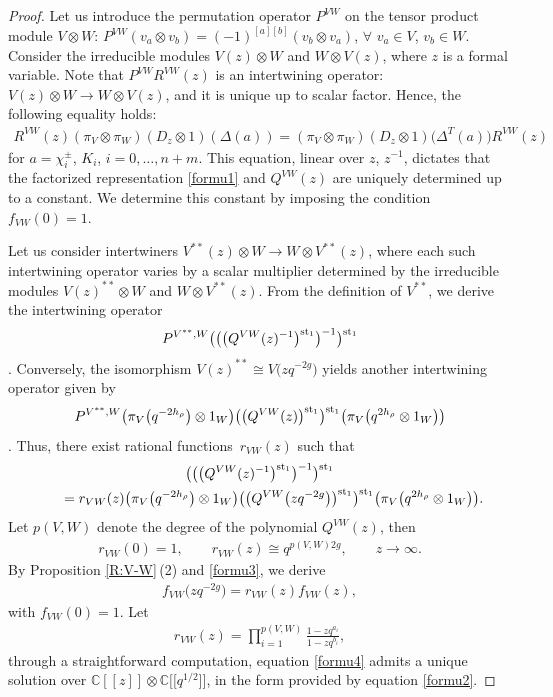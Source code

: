 \documentclass[pdftex]{sigma}
\numberwithin{equation}{section}
\begin{document}
\begin{proof}
Let us introduce the permutation operator $P^{VW}$ on the tensor product module $V\otimes W$: $P^{VW}(v_a\otimes v_b)=(-1)^{[a][b]}(v_b\otimes v_a)$, $\forall$ $v_a\in V$, $v_b\in W$. Consider the irreducible modules $V(z)\otimes W$ and $W\otimes V(z)$, where $z$ is a formal variable. Note that $P^{VW}R^{VW}(z)$ is an intertwining operator: $V(z)\otimes W\rightarrow W\otimes V(z)$, and it is unique up to scalar factor.
Hence, the following equality holds:
\begin{gather*}
 R^{VW}(z)(\pi_V\otimes\pi_W)(D_z\otimes1)(\Delta(a))=(\pi_V\otimes\pi_W)(D_z\otimes1)\bigl(\Delta^T(a)\bigr)R^{VW}(z)
\end{gather*}
for $a=\chi_i^{\pm}$, $K_i$, $i=0,\dots,n+m$. This equation, linear over $z$, $z^{-1}$, dictates that the factorized representation \eqref{formu1} and $Q^{VW}(z)$ are uniquely determined up to a constant. We determine this constant by imposing the condition $f_{VW}(0)=1$.

Let us consider intertwiners $V^{\ast\ast}(z)\otimes W\rightarrow W\otimes V^{\ast\ast}(z)$, where each such intertwining operator varies by a scalar multiplier determined by the irreducible modules $V(z)^{\ast\ast}\otimes W$ and $W\otimes V^{\ast\ast}(z)$. From the definition of $V^{\ast\ast}$, we derive the intertwining operator \[P^{V^{\ast\ast},W} \bigl(\bigl(\bigl(Q^{VW}(z)^{-1}\bigr)^{{\rm st}_1}\bigr)^{-1}\bigr)^{{\rm st}_1}\]. Conversely, the isomorphism $V(z)^{\ast\ast}\cong V\bigl(zq^{-2g}\bigr)$ yields another intertwining operator given by
 \[P^{V^{\ast\ast},W}\bigl(\pi_V\bigl(q^{-2h_\rho}\bigr)\otimes1_W\bigr)
\bigl(\bigl(Q^{VW}(z)\bigr)^{{\rm st}_1}\bigr)^{{\rm st}_1}\bigl(\pi_V\bigl(q^{2h_\rho}\otimes1_W\bigr)\bigr)\]. Thus, there exist rational functions~$r_{VW}(z)$ such that
\begin{gather}
 \bigl(\bigl(\bigl(Q^{VW}(z)^{-1}\bigr)^{{\rm st}_1}\bigr)^{-1}\bigr)^{{\rm st}_1}\nonumber\\
 \qquad=r_{VW}(z)\bigl(\pi_V\bigl(q^{-2h_\rho}\bigr)\otimes1_W\bigr)
\bigl(\bigl(Q^{VW}\bigl(zq^{-2g}\bigr)\bigr)^{{\rm st}_1}\bigr)^{{\rm st}_1}\bigl(\pi_V\bigl(q^{2h_\rho}\otimes1_W\bigr)\bigr).\label{formu3}
\end{gather}
Let $p(V,W)$ denote the degree of the polynomial $Q^{VW}(z)$, then
\begin{gather*}
 r_{VW}(0)=1,\qquad r_{VW}(z)\cong q^{p(V,W)2g},\qquad z\rightarrow\infty.
\end{gather*}
By Proposition \ref{R:V-W}\,(2) and \eqref{formu3}, we derive
\begin{gather}\label{formu4}
 f_{VW}\bigl(zq^{-2g}\bigr)= r_{VW}(z) f_{VW}(z),
\end{gather}
with $f_{VW}(0)=1$.
Let
\begin{gather*}%
 r_{VW}(z)=\prod\limits_{i=1}^{p(V,W)}\frac{1-zq^{a_i}}{1-zq^{b_i}},
\end{gather*}
through a straightforward computation, equation \eqref{formu4} admits a unique solution over $\mathbb{C}[[z]]\otimes\mathbb{C}\bigl[\bigl[q^{1/2}\bigr]\bigr]$, in the form provided by equation \eqref{formu2}.
\end{proof}
\end{document}
